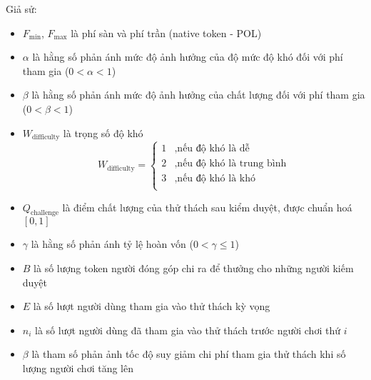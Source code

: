Giả sử:
\begin{itemize}
  \item $F_{\text{min}}$, $F_{\text{max}}$ là phí sàn và phí trần (native token - POL)
  \item $\alpha$ là hằng số phản ánh mức độ ảnh hưởng của độ mức độ khó đối với phí tham gia ($0<\alpha<1$)
  \item $\beta$ là hằng số phản ánh mức độ ảnh hưởng của chất lượng đối với phí tham gia ($0<\beta<1$)
  \item $W_{\text{difficulty}}$ là trọng số độ khó
        \[
          W_{\text{difficulty}} =
          \begin{cases}
            1 & , \text{nếu độ khó là dễ}         \\
            2 & , \text{nếu độ khó là trung bình} \\
            3 & , \text{nếu độ khó là khó}        \\
          \end{cases}
        \]
  \item $Q_{\text{challenge}}$ là điểm chất lượng của thử thách sau kiểm duyệt, được chuẩn hoá $[0,1]$
  \item $\gamma$ là hằng số phản ánh tỷ lệ hoàn vốn ($0 < \gamma \le 1$)
  \item $B$ là số lượng token người đóng góp chi ra để thưởng cho những người kiếm duyệt
  \item $E$ là số lượt người dùng tham gia vào thử thách kỳ vọng
  \item $n_i$ là số lượt người dùng đã tham gia vào thử thách trước người chơi thứ $i$
  \item $\beta$ là tham số phản ảnh tốc độ suy giảm chi phí tham gia thử thách khi số lượng người chơi tăng lên
\end{itemize}

